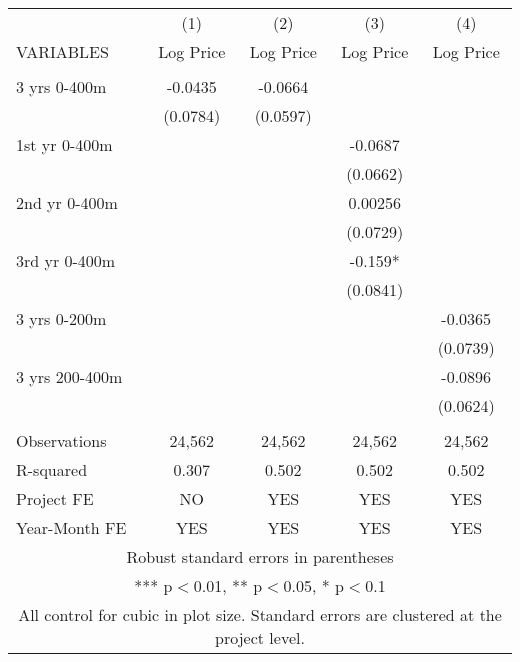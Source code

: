 \begin{tabular}{lcccc} \hline
 & (1) & (2) & (3) & (4) \\
VARIABLES & Log Price & Log Price & Log Price & Log Price \\ \hline
 &  &  &  &  \\
3 yrs 0-400m & -0.0435 & -0.0664 &  &  \\
 & (0.0784) & (0.0597) &  &  \\
1st yr 0-400m &  &  & -0.0687 &  \\
 &  &  & (0.0662) &  \\
2nd yr 0-400m &  &  & 0.00256 &  \\
 &  &  & (0.0729) &  \\
3rd yr 0-400m &  &  & -0.159* &  \\
 &  &  & (0.0841) &  \\
3 yrs 0-200m &  &  &  & -0.0365 \\
 &  &  &  & (0.0739) \\
3 yrs 200-400m &  &  &  & -0.0896 \\
 &  &  &  & (0.0624) \\
 &  &  &  &  \\
Observations & 24,562 & 24,562 & 24,562 & 24,562 \\
R-squared & 0.307 & 0.502 & 0.502 & 0.502 \\
Project FE & NO & YES & YES & YES \\
 Year-Month FE & YES & YES & YES & YES \\ \hline
\multicolumn{5}{c}{ Robust standard errors in parentheses} \\
\multicolumn{5}{c}{ *** p$<$0.01, ** p$<$0.05, * p$<$0.1} \\
\multicolumn{5}{c}{ All control for cubic in plot size. Standard errors are clustered at the project level.} \\
\end{tabular}
